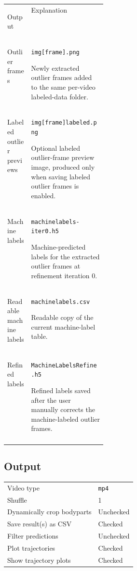 \documentclass[11pt]{article}
\newif\ifalmaoutputtable
\newcommand{\boxedtoprule}{%
  \ifalmaoutputtable
    \arrayrulecolor{calloutOutputFrame}\hline\rowcolor{calloutOutputHeader}%
  \else
    \arrayrulecolor{almaBlue!62}\hline\rowcolor{almaSky!78}%
  \fi
}
\newcommand{\boxedmidrule}{%
  \ifalmaoutputtable
    \arrayrulecolor{calloutOutputFrame}\hline
  \else
    \arrayrulecolor{calloutDataFrame}\hline
  \fi
}
\newcommand{\boxedbottomrule}{%
  \ifalmaoutputtable
    \arrayrulecolor{calloutOutputFrame}\hline
  \else
    \arrayrulecolor{almaBlue!62}\hline
  \fi
}
\renewcommand{\[}{%
  \par\smallskip\noindent
  \begin{center}%
  \setlength{\fboxsep}{5pt}%
  \setlength{\fboxrule}{0.35pt}%
  \begin{lrbox}{\almaEquationBox}%
  $\displaystyle
}
\renewcommand{\]}{%
  $%
  \end{lrbox}%
  \fcolorbox{equationLine}{equationBack}{\usebox{\almaEquationBox}}%
  \end{center}%
  \smallskip\par
}
\begin{document}
\begin{tcolorbox}[output file box,title=\textbf{Optional Refinement Output Files}]
\begin{tabularx}{\linewidth}{
>{\bfseries\raggedright\arraybackslash}p{0.24\linewidth}|
>{\raggedright\arraybackslash}X
}
\boxedtoprule
Output & Explanation \\
\boxedmidrule
Outlier frames & \texttt{img[frame].png}\par
Newly extracted outlier frames added to the same per-video labeled-data folder. \\
Labeled outlier previews & \texttt{img[frame]labeled.png}\par
Optional labeled outlier-frame preview image, produced only when saving labeled outlier frames is enabled. \\
Machine labels & \texttt{machinelabels-iter0.h5}\par
Machine-predicted labels for the extracted outlier frames at refinement iteration 0. \\
Readable machine labels & \texttt{machinelabels.csv}\par
Readable copy of the current machine-label table. \\
Refined labels & \texttt{MachineLabelsRefine.h5}\par
Refined labels saved after the user manually corrects the machine-labeled outlier frames. \\
\boxedbottomrule
\end{tabularx}
\end{tcolorbox}


\subsection{Output}\label{sec:dlc-output}

\begin{tcolorbox}[software settings,title=\textbf{Analyze Videos: Recommended Settings}]
\begin{tabularx}{\linewidth}{KV}
Video type & \texttt{mp4} \\
Shuffle & 1 \\
Dynamically crop bodyparts & Unchecked \\
Save result(s) as CSV & Checked \\
Filter predictions & Unchecked \\
Plot trajectories & Checked \\
Show trajectory plots & Checked \\
\end{tabularx}
\end{tcolorbox}
\end{document}
